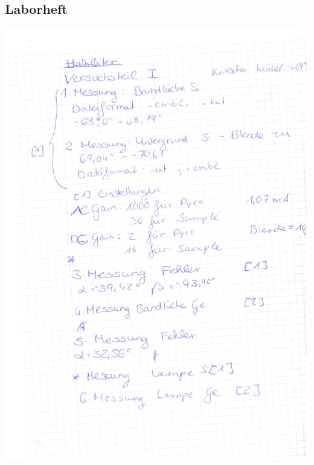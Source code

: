 \documentclass[12pt]{article}
\begin{document}
\subsection{Laborheft}
\begin{minipage}{\textwidth}
	\centering
	\includegraphics[width=\textwidth]{figures/Buch1.pdf}
\end{minipage}
\end{document}
